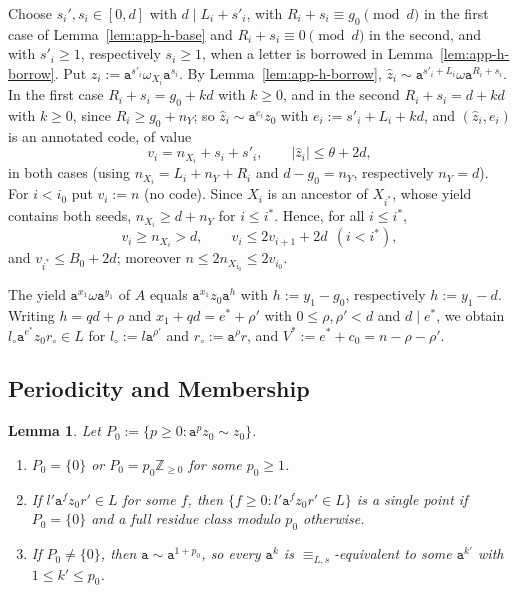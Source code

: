 \documentclass[11pt]{article}
\numberwithin{equation}{section}
\theoremstyle{plain}
\newtheorem{lemma}[theorem]{Lemma}
\theoremstyle{definition}
\theoremstyle{remark}
\theoremstyle{plain}
\begin{document}
Choose $s_i',s_i\in[0,d]$ with $d\mid L_i+s'_i$, with $R_i+s_i\equiv g_0\pmod d$
in the first case of Lemma~\ref{lem:app-h-base} and $R_i+s_i\equiv0\pmod d$ in
the second, and with $s'_i\ge1$, respectively $s_i\ge1$, when a letter is
borrowed in Lemma~\ref{lem:app-h-borrow}.  Put $\hat z_i:=\mathtt
a^{s'_i}\omega_{X_i}\mathtt a^{s_i}$.  By Lemma~\ref{lem:app-h-borrow},
$\hat z_i\sim\mathtt a^{s'_i+L_i}\omega\mathtt a^{R_i+s_i}$.  In the first case
$R_i+s_i=g_0+kd$ with $k\ge0$, and in the second $R_i+s_i=d+kd$ with $k\ge0$,
since $R_i\ge g_0+n_Y$; so $\hat z_i\sim\mathtt a^{e_i}z_0$ with
$e_i:=s'_i+L_i+kd$, and $(\hat z_i,e_i)$ is an annotated code, of value
\[
 v_i=n_{X_i}+s_i+s'_i,\qquad|\hat z_i|\le\theta+2d,
\]
in both cases (using $n_{X_i}=L_i+n_Y+R_i$ and $d-g_0=n_Y$, respectively
$n_Y=d$).  For $i<i_0$ put $v_i:=n$ (no code).  Since $X_i$ is an ancestor of
$X_{i^*}$, whose yield contains both seeds, $n_{X_i}\ge d+n_Y$ for $i\le i^*$.
Hence, for all $i\le i^*$,
\begin{equation}
\label{eq:app-h-star}
 v_i\ge n_{X_i}>d,\qquad v_i\le2v_{i+1}+2d\ \ (i<i^*),
\end{equation}
and $v_{i^*}\le B_0+2d$; moreover $n\le2n_{X_{i_0}}\le2v_{i_0}$.

The yield $\mathtt a^{x_1}\omega\mathtt a^{y_1}$ of $A$ equals $\mathtt
a^{x_1}z_0\mathtt a^{h}$ with $h:=y_1-g_0$, respectively $h:=y_1-d$.  Writing
$h=qd+\rho$ and $x_1+qd=e^*+\rho'$ with $0\le\rho,\rho'<d$ and $d\mid e^*$, we
obtain $l_\circ\mathtt a^{e^*}z_0r_\circ\in L$ for $l_\circ:=l\mathtt a^{\rho'}$
and $r_\circ:=\mathtt a^\rho r$, and $V^*:=e^*+c_0=n-\rho-\rho'$.

\subsection{Periodicity and Membership}

\begin{lemma}
\label{lem:app-h-period}
Let $P_0:=\{p\ge0:\mathtt a^pz_0\sim z_0\}$.
\begin{enumerate}[label=\textup{(\roman*)},leftmargin=*]
\item $P_0=\{0\}$ or $P_0=p_0\mathbb Z_{\ge0}$ for some $p_0\ge1$.
\item If $l'\mathtt a^fz_0r'\in L$ for some $f$, then
$\{f\ge0:l'\mathtt a^fz_0r'\in L\}$ is a single point if $P_0=\{0\}$ and a
full residue class modulo $p_0$ otherwise.
\item If $P_0\ne\{0\}$, then $\mathtt a\sim\mathtt a^{1+p_0}$, so every
$\mathtt a^k$ is $\equiv_{L,s}$-equivalent to some $\mathtt a^{k'}$ with $1\le k'\le p_0$.
\end{enumerate}
\end{lemma}
\end{document}
